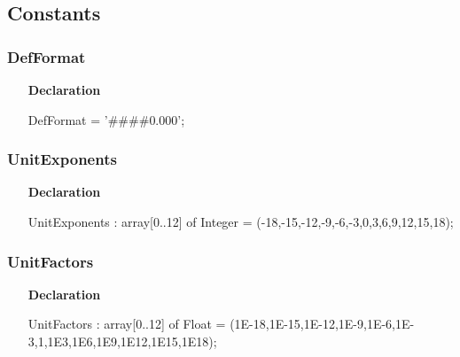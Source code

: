\documentclass[12pt,a4paper,oneside]{report}
\newcommand{\declarationitem}[1]{\textbf{#1}}
\begin{document}
\subsection{Constants}
\subsubsection{DefFormat}
\label{lmunitsformat-DefFormat}
\begin{itemize}\item[\declarationitem{Declaration}\hfill]
	\begin{flushleft}
		\begin{ttfamily}
			DefFormat = '{\#}{\#}{\#}{\#}0.000';\end{ttfamily}
		
	\end{flushleft}
	
\end{itemize}
\subsubsection{UnitExponents}
\label{lmunitsformat-UnitExponents}
\begin{itemize}\item[\declarationitem{Declaration}\hfill]
	\begin{flushleft}
		\begin{ttfamily}
			UnitExponents : array[0..12] of Integer = (-18,-15,-12,-9,-6,-3,0,3,6,9,12,15,18);\end{ttfamily}
		
	\end{flushleft}
	
\end{itemize}
\subsubsection{UnitFactors}
\label{lmunitsformat-UnitFactors}
\begin{itemize}\item[\declarationitem{Declaration}\hfill]
	\begin{flushleft}
		\begin{ttfamily}
			UnitFactors : array[0..12] of Float = (1E-18,1E-15,1E-12,1E-9,1E-6,1E-3,1,1E3,1E6,1E9,1E12,1E15,1E18);\end{ttfamily}
		
	\end{flushleft}
	
\end{itemize}
\end{document}
